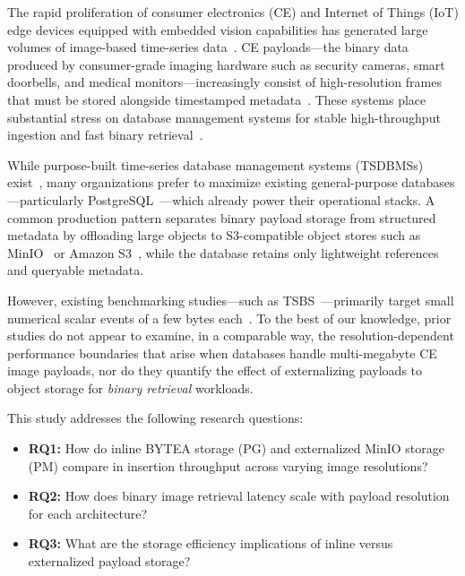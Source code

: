 \documentclass[conference, a4paper]{IEEEtran}
\begin{document}
The rapid proliferation of consumer electronics (CE) and Internet of Things (IoT) edge devices equipped with embedded vision capabilities has generated large volumes of image-based time-series data~\cite{ieee_ce_definition}. CE payloads---the binary data produced by consumer-grade imaging hardware such as security cameras, smart doorbells, and medical monitors---increasingly consist of high-resolution frames that must be stored alongside timestamped metadata~\cite{intuz_iot_databases,ceec_tsdb_review}. These systems place substantial stress on database management systems for stable high-throughput ingestion and fast binary retrieval~\cite{jensen_tsms_survey,nerc_tsdb_survey}.

While purpose-built time-series database management systems (TSDBMSs) exist~\cite{dewaal_timeseries_survey,tigerdata_tsdb_compare}, many organizations prefer to maximize existing general-purpose databases---particularly PostgreSQL~\cite{postgresql_official}---which already power their operational stacks. A common production pattern separates binary payload storage from structured metadata by offloading large objects to S3-compatible object stores such as MinIO~\cite{minio_official} or Amazon S3~\cite{aws_s3_official}, while the database retains only lightweight references and queryable metadata.

However, existing benchmarking studies---such as TSBS~\cite{tsbs}---primarily target small numerical scalar events of a few bytes each~\cite{tsbs,cratedb_ts_benchmark,diva_timescaledb_mongodb_eval}. To the best of our knowledge, prior studies do not appear to examine, in a comparable way, the resolution-dependent performance boundaries that arise when databases handle multi-megabyte CE image payloads, nor do they quantify the effect of externalizing payloads to object storage for \emph{binary retrieval} workloads.

This study addresses the following research questions:
\begin{itemize}
    \item \textbf{RQ1:} How do inline BYTEA storage (PG) and externalized MinIO storage (PM) compare in insertion throughput across varying image resolutions?
    \item \textbf{RQ2:} How does binary image retrieval latency scale with payload resolution for each architecture?
    \item \textbf{RQ3:} What are the storage efficiency implications of inline versus externalized payload storage?
\end{itemize}
\end{document}
